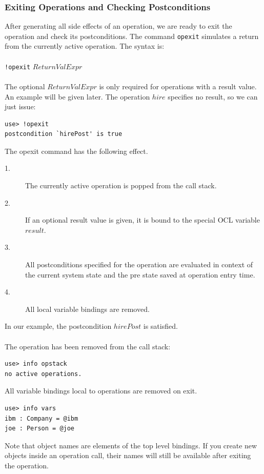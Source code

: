 \documentclass[a4paper,titlepage,oneside,final]{scrreprt} %
\begin{document}
\subsubsection{Exiting Operations and Checking Postconditions}
After generating all side effects of an operation,
we are ready to exit the operation and check its
postconditions. The command \verb+opexit+ simulates a
return from the currently active operation. The syntax is:\\\\
\verb+!opexit+ $\mathit{ReturnValExpr}$\\\\
The optional $\mathit{ReturnValExpr}$ is only required
for operations with a result value.
An example will be given later. The operation $\mathit{hire}$ specifies no result,
so we can just issue:
\begin{verbatim}
use> !opexit
postcondition `hirePost' is true
\end{verbatim}
The opexit command has the following effect.
\begin{description}
\item[1.] The currently active operation is popped from the call stack.
\item[2.] If an optional result value is given, it is
bound to the special OCL variable $\mathit{result}$.
\item[3.] All postconditions specified for the operation are
evaluated in context of the current system state and the
pre state saved at operation entry time.
\item[4.] All local variable bindings are removed.
\end{description}
In our example, the postcondition $\mathit{hirePost}$ is satisfied.\\\\
The operation has been removed from the call stack:
\begin{verbatim}
use> info opstack
no active operations.
\end{verbatim}
All variable bindings local to operations are removed on exit.
\begin{verbatim}
use> info vars
ibm : Company = @ibm
joe : Person = @joe
\end{verbatim}
Note that object names are elements of the top level bindings.
If you create new objects inside an operation call,
their names will still be available after exiting the operation.
\end{document}
